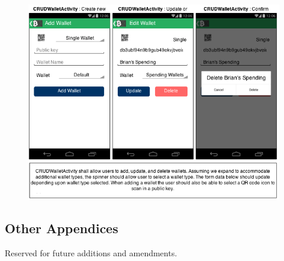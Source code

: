   \begin{figure}[H]
     \includegraphics[width=1.0\textwidth]{../diagrams/storyboard_CRUDwallet.png}
  \end{figure}
  
	
	
  \subsection{Other Appendices}
  \textsf Reserved for future additions and amendments. \\
